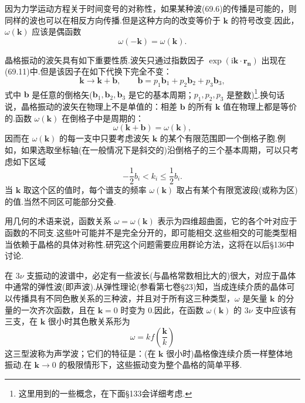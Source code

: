 因为力学运动方程关于时间变号的对称性，如果某种波(69.6)的传播是可能的，则同样的波也可以在相反方向传播.但是这种方向的改变等价于 $\boldsymbol{k}$ 的符号改变.因此，$\omega(\boldsymbol{k})$ 应该是偶函数
\begin{equation}
  \omega(-\boldsymbol{k})=\omega(\boldsymbol{k}).
\end{equation}

晶格振动的波矢具有如下重要性质.波矢只通过指数因子 $\exp\left(\mathrm{i}\boldsymbol{k}\cdot\boldsymbol{r}_{\boldsymbol{n}}\right)$ 出现在(69.11)中.但是该因子在如下代换下完全不变：
\begin{equation}
  \boldsymbol{k}\to\boldsymbol{k}+\boldsymbol{b},\qquad
  \boldsymbol{b}=p_1\boldsymbol{b}_1+p_2\boldsymbol{b}_2+p_3\boldsymbol{b}_3,
\end{equation}
式中 $\boldsymbol{b}$ 是任意的倒格矢($\boldsymbol{b}_1,\boldsymbol{b}_2,\boldsymbol{b}_3$ 是它的基本周期；$p_1,p_2,p_3$ 是整数)\footnote{这里用到的一些概念，在下面§133会详细考虑.}.换句话说，晶格振动的波矢在物理上不是单值的：相差 $\boldsymbol{b}$ 的所有 $\boldsymbol{k}$ 值在物理上都是等价的.函数 $\omega(\boldsymbol{k})$ 在倒格子中是周期的：
\begin{equation*}
  \omega(\boldsymbol{k}+\boldsymbol{b})=\omega(\boldsymbol{k}),
\end{equation*}
因而在 $\omega(\boldsymbol{k})$ 的每一支中只要考虑波矢 $\boldsymbol{k}$ 的某个有限范围即一个倒格子胞.例如，如果选取坐标轴(在一般情况下是斜交的)沿倒格子的三个基本周期，可以只考虑如下区域
\begin{equation}
  -\frac{1}{2}b_i<k_i\leqslant\frac{1}{2}b_i.
\end{equation}
当 $\boldsymbol{k}$ 取这个区的值时，每个谱支的频率 $\omega(\boldsymbol{k})$ 取占有某个有限宽波段(或称为区)的值.当然不同区可能部分交叠.

用几何的术语来说，函数关系 $\omega=\omega(\boldsymbol{k})$ 表示为四维超曲面，它的各个叶对应于函数的不同支.这些叶可能并不是完全分开的，即可能相交.这些相交的可能类型相当依赖于晶格的具体对称性.研究这个问题需要应用群论方法，这将在以后§136中讨论.

在 $3\nu$ 支振动的波谱中，必定有一些波长(与晶格常数相比大的)很大，对应于晶体中通常的弹性波(即声波).从弹性理论(参看第七卷§23)知，当成连续介质的晶体可以传播具有不同色散关系的三种波，并且对于所有这三种类型，$\omega$ 是矢量 $\boldsymbol{k}$ 的分量的一次齐次函数，且在 $\boldsymbol{k}=0$ 时变为 0.因此，在函数 $\omega(\boldsymbol{k})$ 的 $3\nu$ 支中应该有三支，在 $\boldsymbol{k}$ 很小时其色散关系形为
\begin{equation}
  \omega=kf\left(\frac{\boldsymbol{k}}{k}\right)
\end{equation}
这三型波称为声学波；它们的特征是：(在 $\boldsymbol{k}$ 很小时)晶格像连续介质一样整体地振动.在 $\boldsymbol{k}\to0$ 的极限情形下，这些振动变为整个晶格的简单平移.

